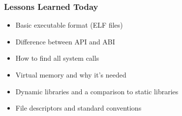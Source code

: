 \documentclass[aspectratio=169]{beamer}
\begin{document}
  \begin{frame}
    \frametitle{Lessons Learned Today}

    \begin{itemize}
      \item Basic executable format (ELF files)
      \vspace{1em}
      \item Difference between API and ABI
      \vspace{1em}
      \item How to find all system calls
      \vspace{1em}
      \item Virtual memory and why it's needed
      \vspace{1em}
      \item Dynamic libraries and a comparison to static libraries
      \vspace{1em}
      \item File descriptors and standard conventions
    \end{itemize}
  \end{frame}
\end{document}
